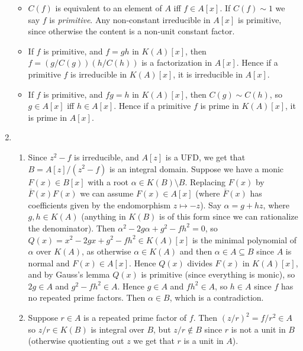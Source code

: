 \documentclass{report}
\newcommand{\conj}[1]{\overline{#1}} %
\begin{document}
\begin{enumerate}[label=\textbf{5.4.\Alph*.}]
\begin{itemize}
		      \item $C(f)$ is equivalent to an element of $A$ iff $f\in A[x]$. If
		            $C(f)\sim1$ we say $f$ is \emph{primitive}. Any non-constant
		            irreducible in $A[x]$ is primitive, since otherwise the content
		            is a non-unit constant factor.

		      \item If $f$ is primitive, and $f=gh$ in $K(A)[x]$, then
		            $f=(g/C(g))(h/C(h))$ is a factorization in $A[x]$. Hence if
		            a primitive $f$ is irreducible in $K(A)[x]$, it is irreducible
		            in $A[x]$.

		      \item If $f$ is primitive, and $fg=h$ in $K(A)[x]$, then
		            $C(g)\sim C(h)$, so $g\in A[x]$ iff $h\in A[x]$. Hence if a
		            primitive $f$ is prime in $K(A)[x]$, it is prime in $A[x]$.
	      \end{itemize}

	\item
	      \begin{enumerate}[label=(\alph*)]
		      \item Since $z^2-f$ is irreducible, and $A[z]$ is a UFD, we get that
		            $B=A[z]/(z^2-f)$ is an integral domain. Suppose we have a monic
		            $F(x)\in B[x]$ with a root $\alpha\in K(B)\setminus B$.
		            Replacing $F(x)$ by $\conj F(x)F(x)$ we can assume $F(x)\in A[x]$
		            (where $\conj F(x)$ has coefficients given by the endomorphism
		            $z\mapsto -z$). Say $\alpha=g+hz$, where $g,h\in K(A)$ (anything
		            in $K(B)$ is of this form since we can rationalize the
		            denominator). Then $\alpha^2-2g\alpha+g^2-fh^2=0$, so
		            $Q(x)=x^2-2gx+g^2-fh^2\in K(A)[x]$ is the minimal polynomial of
		            $\alpha$ over $K(A)$, as otherwise $\alpha\in K(A)$ and then
		            $\alpha\in A\subseteq B$ since $A$ is normal and $F(x)\in A[x]$.
		            Hence $Q(x)$ divides $F(x)$ in $K(A)[x]$, and by Gauss's lemma
		            $Q(x)$ is primitive (since everything is monic), so $2g\in A$
		            and $g^2-fh^2\in A$. Hence $g\in A$ and $fh^2\in A$, so $h\in A$
		            since $f$ has no repeated prime factors. Then $\alpha\in B$,
		            which is a contradiction.

		      \item Suppose $r\in A$ is a repeated prime factor of $f$. Then
		            $(z/r)^2=f/r^2\in A$ so $z/r\in K(B)$ is integral over $B$, but
		            $z/r\notin B$ since $r$ is not a unit in $B$ (otherwise
		            quotienting out $z$ we get that $r$ is a unit in $A$).
	      \end{enumerate}


\end{enumerate}
\end{document}
